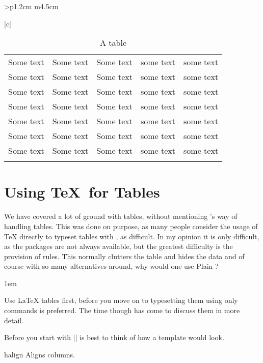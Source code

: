 \begin{tabular}{>{\bfseries}p{1.2cm} m{4.5cm}}
\begin{tabular}[t]{|c|}
\begin{longtable}
\begin{teXX}
\lipsum
\begin{table*}[htbp]
  \centering
  \begin{tabular}{p{1in}p{1in}p{1in}p{1in}p{1in}}
  \hline
  Some text & Some text & Some text & some text & some text\\
  Some text & Some text & Some text & some text & some text\\
  Some text & Some text & Some text & some text & some text\\
  Some text & Some text & Some text & some text & some text\\
  Some text & Some text & Some text & some text & some text\\
  Some text & Some text & Some text & some text & some text\\
  Some text & Some text & Some text & some text & some text\\
  \hline
  \caption{A table}
  \end{tabular}
\end{table*}
\lipsum\lipsum

\end{teXX}
\clearpage

\section{Using \TeX\ for Tables}
  
We have covered a lot of ground with \latex tables, without mentioning \tex's way of handling tables. This was done on purpose, as many people consider the usage of TeX directly to typeset tables with , as difficult. In my opinion it is only difficult, as the packages are not always available, but the greatest difficulty is the provision of rules. This normally clutters the table and hides the data and of course with so many alternatives around, why would one use Plain \tex?

\parindent1em

Use LaTeX tables first, before you move on to typesetting them using only \tex commands is preferred. The time though has come to discuss them in more detail.

Before you start with |\halign| is best to think of how a template would look. 

\begin{docCommand}{halign}{}
Aligns columns.
\begin{teX}
\end{teX}
\end{docCommand}


\end{longtable}
\end{tabular}
\end{tabular}
